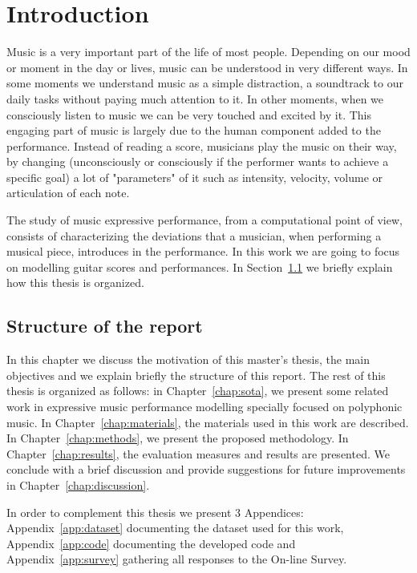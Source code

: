 \normallinespacing

\chapter{Introduction}


\label{chap:introduction}
Music is a very important part of the life of most people. Depending on our mood or moment in the day or lives, music can be understood in very different ways. In some moments we understand music as a simple distraction, a soundtrack to our daily tasks without paying much attention to it. In other moments, when we consciously listen to music we can be very touched and excited by it. This engaging part of music is largely due to the human component added to the performance. Instead of reading a score, musicians play the music on their way, by changing (unconsciously or consciously if the performer wants to achieve a specific goal) a lot of "parameters" of it such as intensity, velocity, volume or articulation of each note. 

The study of music expressive performance, from a computational point of view, consists of characterizing the  deviations that a musician, when performing a musical piece, introduces in the performance. In this work we are going to focus on modelling guitar scores and performances. In Section~\ref{sec:structure} we briefly explain how this thesis is organized.

\section{Structure of the report}
\label{sec:structure}
In this chapter we discuss the motivation of this master's thesis, the main objectives and we explain briefly the structure of this report.
The rest of this thesis is organized as follows: in Chapter~\ref{chap:sota}, we present some related work in expressive music performance modelling specially focused on polyphonic music. In Chapter~\ref{chap:materials}, the materials used in this work are described. In Chapter~\ref{chap:methods}, we present the proposed methodology. In Chapter~\ref{chap:results}, the evaluation measures and results are presented. We conclude with a brief discussion and provide suggestions for future improvements in Chapter~\ref{chap:discussion}. 

In order to complement this thesis we present 3 Appendices: Appendix~\ref{app:dataset} documenting the dataset used for this work, Appendix~\ref{app:code} documenting the developed code and Appendix~\ref{app:survey} gathering all responses to the On-line Survey.

